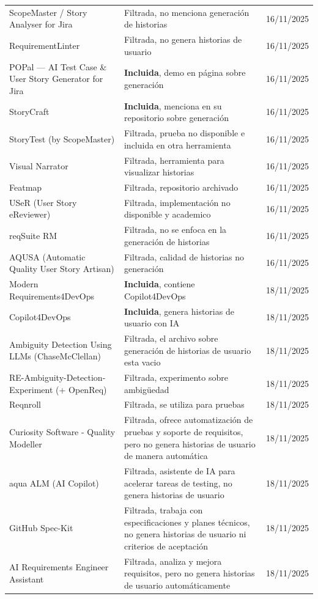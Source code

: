 \begin{center}
\begin{longtable}{|p{6.5cm}|p{4cm}|p{1.8cm}|}
ScopeMaster / Story Analyser for Jira & Filtrada, no menciona generación de historias & 16/11/2025 \\
RequirementLinter & Filtrada, no genera historias de usuario & 16/11/2025 \\
POPal --- AI Test Case \& User Story Generator for Jira & \textbf{Incluida}, demo en página sobre generación & 16/11/2025 \\
StoryCraft & \textbf{Incluida}, menciona en su repositorio sobre generación & 16/11/2025 \\
StoryTest (by ScopeMaster) & Filtrada, prueba no disponible e incluida en otra herramienta & 16/11/2025 \\
Visual Narrator & Filtrada, herramienta para visualizar historias & 16/11/2025 \\
Featmap & Filtrada, repositorio archivado & 16/11/2025 \\
USeR (User Story eReviewer) & Filtrada, implementación no disponible y academico  & 16/11/2025 \\
reqSuite RM & Filtrada, no se enfoca en la generación de historias & 16/11/2025 \\
AQUSA (Automatic Quality User Story Artisan) & Filtrada, calidad de historias no generación & 16/11/2025 \\
Modern Requirements4DevOps & \textbf{Incluida}, contiene Copilot4DevOps & 18/11/2025 \\
Copilot4DevOps & \textbf{Incluida}, genera historias de usuario con IA & 18/11/2025 \\
Ambiguity Detection Using LLMs (ChaseMcClellan) & Filtrada, el archivo sobre generación de historias de usuario esta vacio & 18/11/2025 \\
RE-Ambiguity-Detection-Experiment (+ OpenReq) & Filtrada, experimento sobre ambigüedad & 18/11/2025 \\
Reqnroll & Filtrada, se utiliza para pruebas & 18/11/2025  \\
Curiosity Software - Quality Modeller & Filtrada, ofrece automatización de pruebas y soporte de requisitos, pero no genera historias de usuario de manera automática & 18/11/2025 \\
aqua ALM (AI Copilot) & Filtrada, asistente de IA para acelerar tareas de testing, no genera historias de usuario & 18/11/2025 \\
GitHub Spec-Kit & Filtrada, trabaja con especificaciones y planes técnicos, no genera historias de usuario ni criterios de aceptación & 18/11/2025 \\
AI Requirements Engineer Assistant & Filtrada, analiza y mejora requisitos, pero no genera historias de usuario automáticamente & 18/11/2025 \\

\end{longtable}
\end{center}
